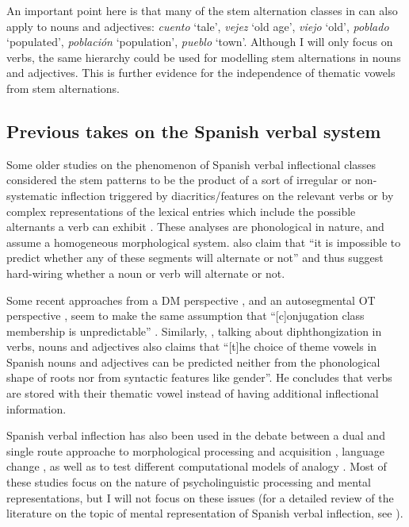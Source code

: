 An important point here is that many of the stem alternation classes in  can also apply to nouns and adjectives: \textit{c\emph{ue}nto} `tale', \textit{v\emph{e}jez} `old age', \textit{v\emph{ie}jo} `old', \textit{p\emph{o}blado} `populated', \textit{p\emph{o}blación} `population', \textit{p\emph{ue}blo} `town'. Although I will only focus on verbs, the same hierarchy could be used for modelling stem alternations in nouns and adjectives. This is further evidence for the independence of thematic vowels from stem alternations.

\subsection{Previous takes on the Spanish verbal system}

Some older studies on the phenomenon of Spanish verbal inflectional classes considered the stem patterns to be the product of a sort of irregular or non-systematic inflection triggered by diacritics/features on the relevant verbs \autocites{FoleyJr.1965, Brame.1973, Harris.1969, Harris.1978} or by complex representations of the lexical entries which include the possible alternants a verb can exhibit \autocite{Hooper.1976}. These analyses are phonological in nature, and assume a homogeneous morphological system. \textcite[43]{Brame.1973} also claim that ``it is impossible to predict whether any of these segments will alternate or not'' and thus suggest hard-wiring whether a noun or verb will alternate or not.

Some recent approaches from a DM perspective \autocite{Arregi.2000}, and an autosegmental OT perspective \autocite{Roca.2010}, seem to make the same assumption that ``[c]onjugation class membership is unpredictable'' \autocite[412]{Roca.2010}. Similarly, \textcite[3]{Bermudez-Otero.2013a}, talking about diphthongization in verbs, nouns and adjectives also claims that ``[t]he choice of theme vowels in Spanish nouns and adjectives can be predicted neither from the phonological shape of roots nor from syntactic features like gender''. He concludes that verbs are stored with their thematic vowel instead of having additional inflectional information.

Spanish verbal inflection has also been used in the debate between a dual and single route approache to morphological processing and acquisition \autocites{Brovetto.2005, Clahsen.2002, Costanzo.2011, Eddington.2009, Yaden.2003}, language change \autocite{GalvanTorres.2007, Wanner.2006}, as well as to test different computational models of analogy \autocite{Albright.2009}. Most of these studies focus on the nature of psycholinguistic processing and mental representations, but I will not focus on these issues (for a detailed review of the literature on the topic of mental representation of Spanish verbal inflection, see \citealt{Eddington.2009}).

